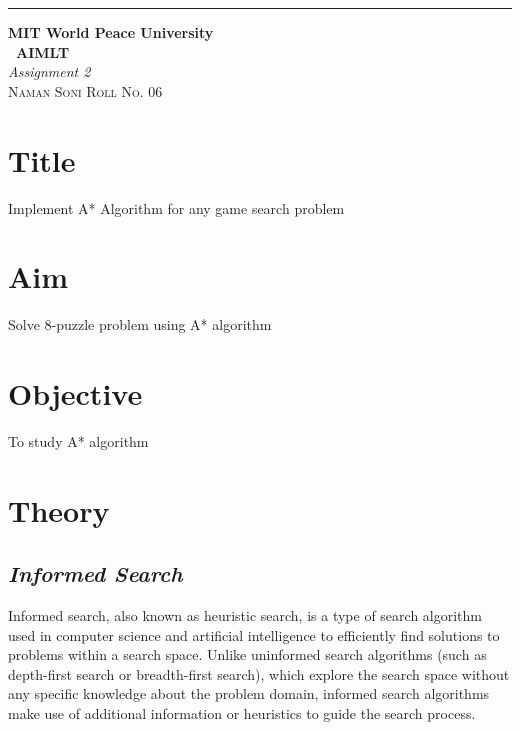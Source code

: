 \documentclass{article}
\begin{document}
\begin{titlepage} %

	\raggedleft\rule{1pt}{\textheight} %
	\hspace{0.05\textwidth} %
	\parbox[b]{0.75\textwidth}
    { %
		
		{\Huge\bfseries MIT World Peace University \\[0.5\baselineskip] \ AIMLT}\\[2\baselineskip] %
		{\large\textit{Assignment 2}}\\[4\baselineskip] %
		{\Large\textsc{Naman Soni Roll No. 06}} %
		
		\vspace{0.5\textheight} %
	}

\end{titlepage}
\tableofcontents
\pagebreak
\section{\textbf{Title}}
Implement A* Algorithm for any game search problem
\section{\textbf{Aim}}
Solve 8-puzzle problem using A* algorithm
\section{\textbf{Objective}}
To study A* algorithm
\section{\textbf{Theory}}
\subsection{\textit{Informed Search}}
Informed search, also known as heuristic search, is a type of search algorithm used in computer science and artificial intelligence to efficiently find solutions to problems within a search space. Unlike uninformed search algorithms (such as depth-first search or breadth-first search), which explore the search space without any specific knowledge about the problem domain, informed search algorithms make use of additional information or heuristics to guide the search process.
\end{document}
